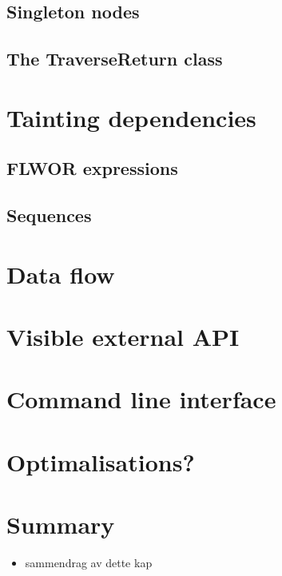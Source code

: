 \subsection{Singleton nodes}
\subsection{The TraverseReturn class}

\section{Tainting dependencies}
\subsection{FLWOR expressions}
\subsection{Sequences}

\section{Data flow}

\section{Visible external API}

\section{Command line interface}

\section{Optimalisations?}


\section{Summary}
\label{sect:impl:summary}
\begin{itemize}
  \item sammendrag av dette kap
\end{itemize}